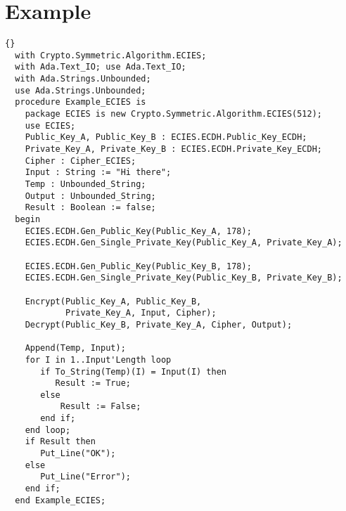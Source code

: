 \section{Example}
\begin{lstlisting}{}
  with Crypto.Symmetric.Algorithm.ECIES;
  with Ada.Text_IO; use Ada.Text_IO;
  with Ada.Strings.Unbounded;
  use Ada.Strings.Unbounded;
  procedure Example_ECIES is
    package ECIES is new Crypto.Symmetric.Algorithm.ECIES(512);
    use ECIES;
    Public_Key_A, Public_Key_B : ECIES.ECDH.Public_Key_ECDH;
    Private_Key_A, Private_Key_B : ECIES.ECDH.Private_Key_ECDH;
    Cipher : Cipher_ECIES;
    Input : String := "Hi there";
    Temp : Unbounded_String;
    Output : Unbounded_String;
    Result : Boolean := false;
  begin
    ECIES.ECDH.Gen_Public_Key(Public_Key_A, 178);
    ECIES.ECDH.Gen_Single_Private_Key(Public_Key_A, Private_Key_A);

    ECIES.ECDH.Gen_Public_Key(Public_Key_B, 178);
    ECIES.ECDH.Gen_Single_Private_Key(Public_Key_B, Private_Key_B);

    Encrypt(Public_Key_A, Public_Key_B, 
            Private_Key_A, Input, Cipher);
    Decrypt(Public_Key_B, Private_Key_A, Cipher, Output);

    Append(Temp, Input);
    for I in 1..Input'Length loop
       if To_String(Temp)(I) = Input(I) then
          Result := True;
       else
	       Result := False;
       end if;
    end loop;
    if Result then
       Put_Line("OK");
    else
       Put_Line("Error");
    end if;
  end Example_ECIES;
\end{lstlisting}
